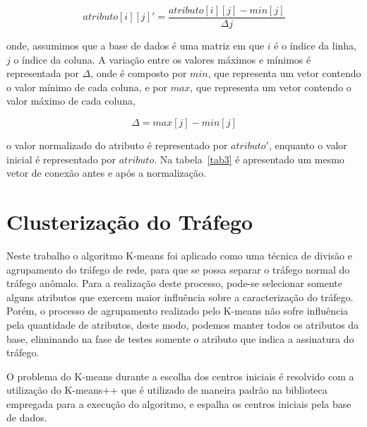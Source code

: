 \vspace{0.3cm}
\begin{equation}
\label{eq:Interpolação Linear} %
atributo[i][j]' = \frac{atributo[i][j] - min[j]}{\Delta j}
\end{equation}
\vspace{0.3cm}

\noindent onde, assumimos que a base de dados é uma matriz em que $ i $ é o índice da linha, $ j $ o índice da coluna. A variação entre os valores máximos e mínimos é representada por $ \Delta $, onde é composto por $ min $, que representa um vetor contendo o valor mínimo de cada coluna, e por  $ max $, que representa um vetor contendo o valor máximo de cada coluna,

\vspace{0.3cm}
\begin{equation}
\label{eq:Valor de Delta} %
\Delta = max[j] - min[j]
\end{equation}
\vspace{0.3cm}

\noindent o valor normalizado do atributo é representado por $ atributo' $, enquanto o valor inicial é representado por $ atributo $. Na tabela~\ref{tab3} é apresentado um mesmo vetor de conexão antes e após a normalização.



  \section{Clusterização do Tráfego}

\indent Neste trabalho o algoritmo K-means foi aplicado como uma técnica de divisão e agrupamento do tráfego de rede, para que se possa separar o tráfego normal do tráfego anômalo. Para a realização deste processo, pode-se selecionar somente alguns atributos que exercem maior influência sobre a caracterização do tráfego. Porém, o processo de agrupamento realizado pelo K-means não sofre influência pela quantidade de atributos, deste modo, podemos manter todos os atributos da base, eliminando na fase de testes somente o atributo que indica a assinatura do tráfego.

\indent O problema do K-means durante a escolha dos centros iniciais é resolvido com a utilização do K-means++ \cite{arthur2007} que é utilizado de maneira padrão na biblioteca empregada para a execução do algoritmo, e espalha os centros iniciais pela base de dados.

